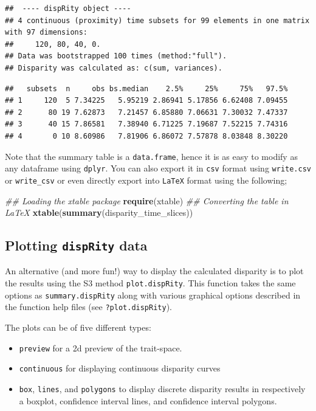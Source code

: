 \documentclass[]{book}
\newenvironment{Shaded}{\begin{snugshade}}{\end{snugshade}}
\newcommand{\CommentTok}[1]{\textcolor[rgb]{0.56,0.35,0.01}{\textit{#1}}}
\newcommand{\KeywordTok}[1]{\textcolor[rgb]{0.13,0.29,0.53}{\textbf{#1}}}
\newcommand{\NormalTok}[1]{#1}
\providecommand{\tightlist}{%
  \setlength{\itemsep}{0pt}\setlength{\parskip}{0pt}}
\begin{document}
\begin{verbatim}
##  ---- dispRity object ---- 
## 4 continuous (proximity) time subsets for 99 elements in one matrix with 97 dimensions:
##     120, 80, 40, 0.
## Data was bootstrapped 100 times (method:"full").
## Disparity was calculated as: c(sum, variances).
\end{verbatim}

\begin{verbatim}
##   subsets  n     obs bs.median    2.5%     25%     75%   97.5%
## 1     120  5 7.34225   5.95219 2.86941 5.17856 6.62408 7.09455
## 2      80 19 7.62873   7.21457 6.85880 7.06631 7.30032 7.47337
## 3      40 15 7.86581   7.38940 6.71225 7.19687 7.52215 7.74316
## 4       0 10 8.60986   7.81906 6.86072 7.57878 8.03848 8.30220
\end{verbatim}

Note that the summary table is a \texttt{data.frame}, hence it is as easy to modify as any dataframe using \texttt{dplyr}.
You can also export it in \texttt{csv} format using \texttt{write.csv} or \texttt{write\_csv} or even directly export into \texttt{LaTeX} format using the following;

\begin{Shaded}
\begin{Highlighting}[]
\CommentTok{## Loading the xtable package}
\KeywordTok{require}\NormalTok{(xtable)}
\CommentTok{## Converting the table in LaTeX}
\KeywordTok{xtable}\NormalTok{(}\KeywordTok{summary}\NormalTok{(disparity_time_slices))}
\end{Highlighting}
\end{Shaded}

\hypertarget{plotting-disprity-data}{%
\subsection{\texorpdfstring{Plotting \texttt{dispRity} data}{Plotting dispRity data}}\label{plotting-disprity-data}}

An alternative (and more fun!) way to display the calculated disparity is to plot the results using the S3 method \texttt{plot.dispRity}.
This function takes the same options as \texttt{summary.dispRity} along with various graphical options described in the function help files (see \texttt{?plot.dispRity}).

The plots can be of five different types:

\begin{itemize}
\tightlist
\item
  \texttt{preview} for a 2d preview of the trait-space.
\item
  \texttt{continuous} for displaying continuous disparity curves
\item
  \texttt{box}, \texttt{lines}, and \texttt{polygons} to display discrete disparity results in respectively a boxplot, confidence interval lines, and confidence interval polygons.
\end{itemize}
\end{document}
